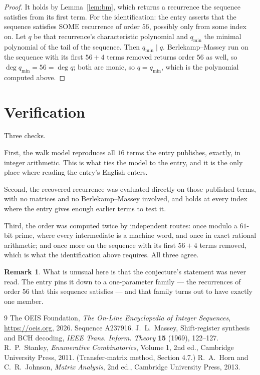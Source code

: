 \documentclass[11pt,a4paper]{article}
\theoremstyle{plain}
\theoremstyle{definition}
\newtheorem{remark}[theorem]{Remark}
\begin{document}
\begin{proof}
It holds by Lemma~\ref{lem:bm}, which returns a recurrence the sequence satisfies from its
first term. For the identification: the entry asserts that the sequence satisfies SOME
recurrence of order $56$, possibly only from some index on. Let $q$ be that recurrence's
characteristic polynomial and $q_{\min}$ the minimal polynomial of the tail of the sequence.
Then $q_{\min}\mid q$. Berlekamp--Massey run on the sequence with its first $56+4$ terms
removed returns order $56$ as well, so $\deg q_{\min}=56=\deg q$; both are monic, so
$q=q_{\min}$, which is the polynomial computed above.
\end{proof}

\section{Verification}

Three checks.

First, the walk model reproduces all $16$ terms the entry publishes, exactly, in integer
arithmetic. This is what ties the model to the entry, and it is the only place where reading
the entry's English enters.

Second, the recovered recurrence was evaluated directly on those published terms, with no
matrices and no Berlekamp--Massey involved, and holds at every index where the entry gives
enough earlier terms to test it.

Third, the order was computed twice by independent routes: once modulo a $61$-bit prime, where
every intermediate is a machine word, and once in exact rational arithmetic; and once more on
the sequence with its first $56+4$ terms removed, which is what the identification above
requires. All three agree.

\begin{remark}
What is unusual here is that the conjecture's statement was never read. The entry pins it down
to a one-parameter family --- the recurrences of order $56$ that this sequence satisfies
--- and that family turns out to have exactly one member.
\end{remark}

\begin{thebibliography}{9}
 The OEIS Foundation, \emph{The On-Line Encyclopedia of Integer
Sequences}, \url{https://oeis.org}, 2026. Sequence A237916.
 J.~L.~Massey, Shift-register synthesis and BCH decoding, \emph{IEEE
Trans. Inform. Theory} \textbf{15} (1969), 122--127.
 R.~P.~Stanley, \emph{Enumerative Combinatorics}, Volume 1, 2nd ed.,
Cambridge University Press, 2011. (Transfer-matrix method, Section 4.7.)
 R.~A.~Horn and C.~R.~Johnson, \emph{Matrix Analysis}, 2nd ed., Cambridge
University Press, 2013.
\end{thebibliography}
\end{document}
